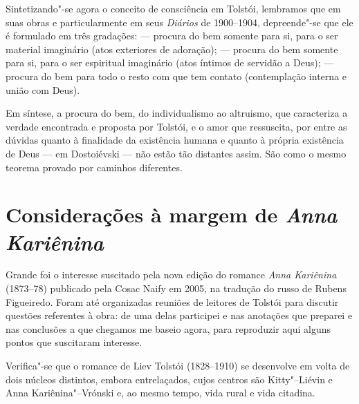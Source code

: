 Sintetizando"-se agora o conceito de consciência em Tolstói, lembramos que em suas
obras e particularmente em seus \emph{Diários} de 1900--1904,
depreende"-se que ele é formulado em três gradações:  --- procura do bem
somente para si, para o ser material imaginário (atos exteriores de
adoração);  --- procura do bem somente para si, para o ser espiritual
imaginário (atos íntimos de servidão a Deus);  --- procura do bem
para todo o resto com que tem contato (contemplação interna e união com Deus).

Em síntese, a procura do bem, do individualismo ao altruismo, que
caracteriza a verdade encontrada e proposta por Tolstói, e o amor que
ressuscita, por entre as dúvidas quanto à finalidade da existência
humana e quanto à própria existência de Deus --- em Dostoiévski --- não estão
tão distantes assim. São como o mesmo teorema provado por caminhos
diferentes.

\chapter{Considerações à margem de \emph{Anna Kariênina}}

Grande foi o interesse suscitado pela nova edição do romance \emph{Anna
Kariênina} (1873--78) publicado pela Cosac Naify em 2005, na tradução do russo de Rubens Figueiredo. Foram até organizadas
reuniões de leitores de Tolstói para discutir questões referentes à
obra: de uma delas participei e nas anotações que preparei e nas
conclusões a que chegamos me baseio agora, para reproduzir aqui alguns
pontos que suscitaram interesse.

Verifica"-se que o romance de Liev Tolstói (1828--1910) se desenvolve em
volta de dois núcleos distintos, embora entrelaçados, cujos centros
são Kitty"--Liévin e Anna Kariênina"--Vrónski e, ao mesmo tempo, vida
rural e vida citadina.

